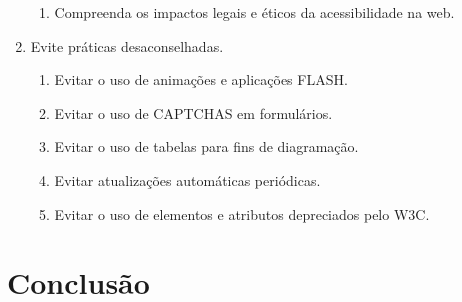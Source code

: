 \documentclass[
  12pt,
  openright,
  twoside,
  a4paper,
  english,
  french,
  spanish,
  brazil
]{abntex2}
\begin{document}
\begin{enumerate}
\begin{enumerate}
    \item Compreenda os impactos legais e éticos da acessibilidade na web.
  \end{enumerate}
  \item Evite práticas desaconselhadas.
  \begin{enumerate}
    \item Evitar o uso de animações e aplicações FLASH.
    \item Evitar o uso de CAPTCHAS em formulários.
    \item Evitar o uso de tabelas para fins de diagramação.
    \item Evitar atualizações automáticas periódicas.
    \item Evitar o uso de elementos e atributos depreciados pelo W3C.
  \end{enumerate}
\end{enumerate}

\chapter{Conclusão}

\postextual



\printindex
\end{document}

